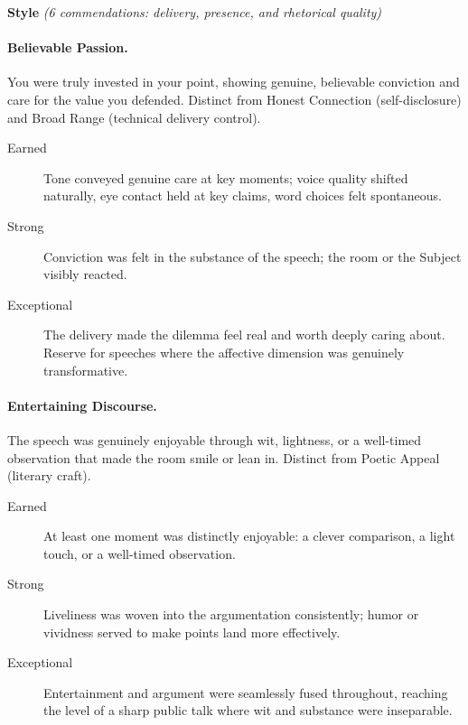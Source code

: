 \documentclass[12pt]{article}
\begin{document}
\medskip
\noindent\textbf{Style} \textit{(6 commendations: delivery, presence, and rhetorical quality)}

\paragraph{Believable Passion.} You were truly invested in your point, showing genuine, believable conviction and care for the value you defended. Distinct from Honest Connection (self-disclosure) and Broad Range (technical delivery control).
\begin{description}
    \item[Earned] Tone conveyed genuine care at key moments; voice quality shifted naturally, eye contact held at key claims, word choices felt spontaneous.
    \item[Strong] Conviction was felt in the substance of the speech; the room or the Subject visibly reacted.
    \item[Exceptional] The delivery made the dilemma feel real and worth deeply caring about. Reserve for speeches where the affective dimension was genuinely transformative.
\end{description}

\paragraph{Entertaining Discourse.} The speech was genuinely enjoyable through wit, lightness, or a well-timed observation that made the room smile or lean in. Distinct from Poetic Appeal (literary craft).
\begin{description}
    \item[Earned] At least one moment was distinctly enjoyable: a clever comparison, a light touch, or a well-timed observation.
    \item[Strong] Liveliness was woven into the argumentation consistently; humor or vividness served to make points land more effectively.
    \item[Exceptional] Entertainment and argument were seamlessly fused throughout, reaching the level of a sharp public talk where wit and substance were inseparable.
\end{description}
\end{document}
